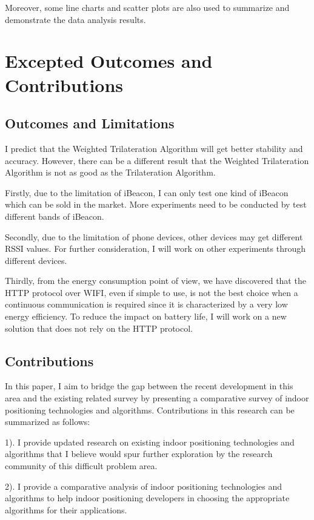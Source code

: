 \documentclass{sigchi}
\begin{document}
Moreover, some line charts and scatter plots are also used to summarize and demonstrate the data analysis results.

\section{Excepted Outcomes and Contributions}

\subsection{Outcomes and Limitations}
I predict that the Weighted Trilateration Algorithm will get better stability and accuracy. However, there can be a different result that the Weighted Trilateration Algorithm is not as good as the Trilateration Algorithm.

Firstly, due to the limitation of iBeacon, I can only test one kind of iBeacon which can be sold in the market. More experiments need to be conducted by test different bands of iBeacon.

Secondly, due to the limitation of phone devices, other devices may get different RSSI values. For further consideration, I will work on other experiments through different devices.

Thirdly, from the energy consumption point of view, we have discovered that the HTTP protocol over WIFI, even if simple to use, is not the best choice when a continuous communication is required since it is characterized by a very low energy efficiency. To reduce the impact on battery life, I will work on a new solution that does not rely on the HTTP protocol.

\subsection{Contributions}
In this paper, I aim to bridge the gap between the recent development in this area and the existing related survey by presenting a comparative survey of indoor positioning technologies and algorithms. Contributions in this research can be summarized as follows:

1). I provide updated research on existing indoor positioning technologies and algorithms that I believe would spur further exploration by the research community of this difficult problem area.

2). I provide a comparative analysis of indoor positioning technologies and algorithms to help indoor positioning developers in choosing the appropriate algorithms for their applications.
\end{document}
